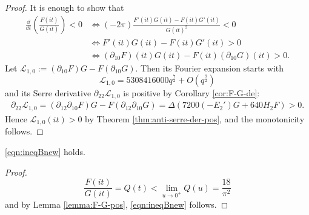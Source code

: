 \begin{proof}
It is enough to show that
\begin{align}
    \frac{\dd}{\dd t} \left(\frac{F(it)}{G(it)}\right) < 0 &\Leftrightarrow (- 2\pi) \frac{F'(it)G(it) - F(it) G'(it)}{G(it)^{2}} < 0 \\
    &\Leftrightarrow F'(it) G(it) - F(it) G'(it) > 0 \\
    &\Leftrightarrow (\partial_{10}F)(it) G(it) - F(it) (\partial_{10}G)(it) > 0.
\end{align}
Let $\mathcal{L}_{1, 0} := (\partial_{10}F) G - F (\partial_{10} G)$.
Then its Fourier expansion starts with
\[
    \mathcal{L}_{1, 0} = 5308416000 q^{\frac{7}{2}} + O(q^{\frac{9}{2}})
\]
and its Serre derivative $\partial_{22} \mathcal{L}_{1, 0}$ is positive by Corollary \ref{cor:F-G-de}:
\begin{align}
    \partial_{22} \mathcal{L}_{1, 0} = (\partial_{12} \partial_{10} F) G - F (\partial_{12}\partial_{10} G)
    = \Delta (7200 (-E_{2}') G + 640 H_2 F) > 0.
\end{align}
Hence $\mathcal{L}_{1, 0}(it) > 0$ by Theorem \ref{thm:anti-serre-der-pos}, and the monotonicity follows.
\end{proof}


\begin{corollary}\label{cor:ineqBnew} 
\eqref{eqn:ineqBnew} holds.
\end{corollary}
\begin{proof}
\begin{equation}
  \frac{F(it)}{G(it)} = Q(t) < \lim_{u \to 0^+} Q(u) = \frac{18}{\pi^2}
\end{equation}
and by Lemma \ref{lemma:F-G-pos}, \eqref{eqn:ineqBnew} follows.
\end{proof}


